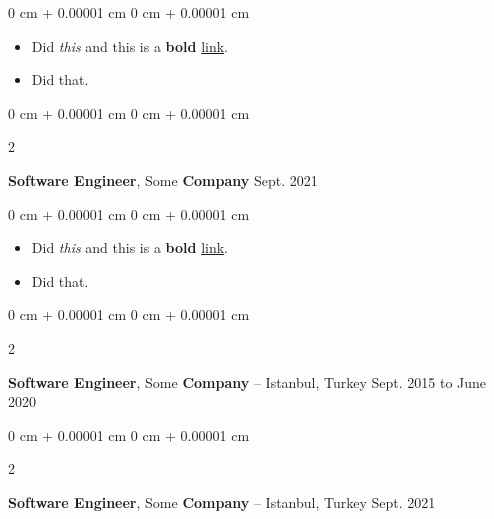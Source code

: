 \documentclass[10pt, letterpaper]{article}
\newenvironment{highlights}{
    \begin{itemize}[
        topsep=0.10 cm,
        parsep=0.10 cm,
        partopsep=0pt,
        itemsep=0pt,
        leftmargin=0 cm + 10pt
    ]
}{
    \end{itemize}
        
    \vspace{-0.10cm}
} %
\newenvironment{onecolentry}{
    \begin{adjustwidth}{
        0 cm + 0.00001 cm
    }{
        0 cm + 0.00001 cm
    }
}{
    \end{adjustwidth}
} %
\newenvironment{twocolentry}[2][]{
    \onecolentry
    \def\secondColumn{#2}
    \setcolumnwidth{\fill, 4.1 cm}
    \begin{paracol}{2}
}{
    \switchcolumn \raggedleft \secondColumn
    \end{paracol}
    \endonecolentry
} %
\begin{document}
        \vspace{0.10 cm}
        \begin{onecolentry}
            \begin{highlights}
                \item Did \textit{this} and this is a \textbf{bold} \href{https://example.com}{link}.
                \item Did that.
            \end{highlights}
        \end{onecolentry}


        \vspace{0.15 cm}

        \begin{twocolentry}{
            Sept. 2021
        }
            \textbf{Software Engineer}, Some \textbf{Company}\end{twocolentry}

        \vspace{0.10 cm}
        \begin{onecolentry}
            \begin{highlights}
                \item Did \textit{this} and this is a \textbf{bold} \href{https://example.com}{link}.
                \item Did that.
            \end{highlights}
        \end{onecolentry}


        \vspace{0.15 cm}

        \begin{twocolentry}{
            Sept. 2015 to June 2020
        }
            \textbf{Software Engineer}, Some \textbf{Company} -- Istanbul, Turkey\end{twocolentry}

        \vspace{0.10 cm}


        \vspace{0.15 cm}

        \begin{twocolentry}{
            Sept. 2021
        }
            \textbf{Software Engineer}, Some \textbf{Company} -- Istanbul, Turkey\end{twocolentry}

        \vspace{0.10 cm}


        \vspace{0.15 cm}
\end{document}
